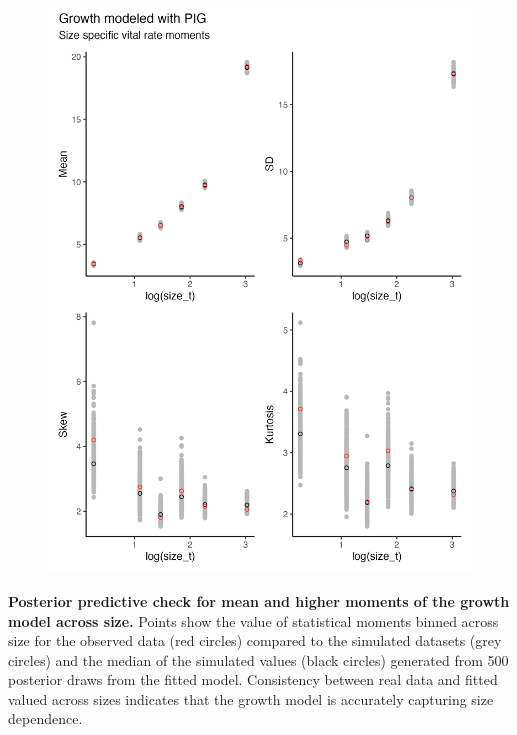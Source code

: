 \documentclass[12pt]{article}
\begin{document}
\begin{figure}
	\centering
	\includegraphics[width=.6\linewidth]{figS5_size_ppc_plot.png}
\end{figure}
 \textbf{Posterior predictive check for mean and higher moments of the growth model across size.} Points show the value of statistical moments binned across size for the observed data (red circles) compared to the simulated datasets (grey circles) and the median of the simulated values (black circles) generated from 500 posterior draws from the fitted model. Consistency between real data and fitted valued across sizes indicates that the growth model is accurately capturing size dependence.
\newpage
\end{document}
